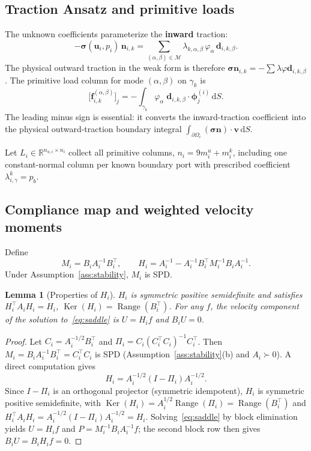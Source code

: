 \documentclass[11pt,a4paper]{article}
\newtheorem{lemma}[assumption]{Lemma}
\newcommand{\R}{\mathbb{R}}
\newcommand{\pore}[1]{\Omega_{#1}}
\newcommand{\iface}{\gamma}
\newcommand{\vel}{\bm{u}}
\newcommand{\pres}{p}
\newcommand{\stress}{\bm{\sigma}}
\newcommand{\normal}{\bm{n}}
\newcommand{\modeset}{\mathcal{M}}
\newcommand{\loadvec}{\bm{f}}
\newcommand{\Range}{\operatorname{Range}}
\newcommand{\Ker}{\operatorname{Ker}}
\begin{document}
\subsection{Traction Ansatz and primitive loads}

The unknown coefficients parameterize the \textbf{inward} traction:
\begin{equation}\label{eq:traction}
  -\stress(\vel_i,\pres_i)\,\normal_{i,k}
  = \sum_{(\alpha,\beta)\in\modeset}
    \lambda_{k,\alpha,\beta}\,\varphi_\alpha\,\bm{d}_{i,k,\beta}.
\end{equation}
The physical outward traction in the weak form is therefore
$\stress\normal_{i,k} = -\sum \lambda\varphi\bm{d}_{i,k,\beta}$.
The primitive load column for mode $(\alpha,\beta)$ on $\iface_k$ is
\begin{equation}\label{eq:load}
  \bigl[\loadvec_{i,k}^{(\alpha,\beta)}\bigr]_j
  = -\int_{\iface_k} \varphi_\alpha\;
    \bm{d}_{i,k,\beta}\cdot\bm{\phi}_j^{(i)}\,\mathrm{d}S.
\end{equation}
The leading minus sign is essential: it converts the inward-traction
coefficient into the physical outward-traction boundary integral
$\int_{\partial\pore{i}} (\stress\normal)\cdot\bm{v}\,\mathrm{d}S$.

Let $L_i \in \R^{n_{u,i}\times n_i}$ collect all primitive columns,
$n_i = 9m_i^u + m_i^k$, including one constant-normal column per known
boundary port with prescribed coefficient $\lambda_{i,\gamma}^k = p_b$.

\subsection{Compliance map and weighted velocity moments}

Define
\begin{equation}\label{eq:H}
  M_i = B_i A_i^{-1}B_i^\top,\qquad
  H_i = A_i^{-1} - A_i^{-1}B_i^\top M_i^{-1}B_i A_i^{-1}.
\end{equation}
Under Assumption~\ref{ass:stability}, $M_i$ is SPD.

\begin{lemma}[Properties of $H_i$]\label{lem:H}
  $H_i$ is symmetric positive semidefinite and satisfies
  $H_i^\top A_i H_i = H_i$,
  $\Ker(H_i) = \Range(B_i^\top)$.
  For any $f$, the velocity component of the solution to~\eqref{eq:saddle}
  is $U = H_i f$ and $B_i U = 0$.
\end{lemma}

\begin{proof}
  Let $C_i = A_i^{-1/2} B_i^\top$ and
  $\Pi_i = C_i (C_i^\top C_i)^{-1} C_i^\top$.
  Then $M_i = B_i A_i^{-1} B_i^\top = C_i^\top C_i$ is SPD
  (Assumption~\ref{ass:stability}(b) and $A_i \succ 0$).
  A direct computation gives
  \[
    H_i = A_i^{-1/2}(I - \Pi_i)A_i^{-1/2}.
  \]
  Since $I - \Pi_i$ is an orthogonal projector (symmetric idempotent),
  $H_i$ is symmetric positive semidefinite, with
  $\Ker(H_i) = A_i^{1/2}\Range(\Pi_i) = \Range(B_i^\top)$
  and $H_i^\top A_i H_i = A_i^{-1/2}(I-\Pi_i)A_i^{-1/2}
   = H_i$.
  Solving~\eqref{eq:saddle} by block elimination yields $U = H_i f$
  and $P = M_i^{-1} B_i A_i^{-1} f$; the second block row then gives
  $B_i U = B_i H_i f = 0$.
\end{proof}
\end{document}

